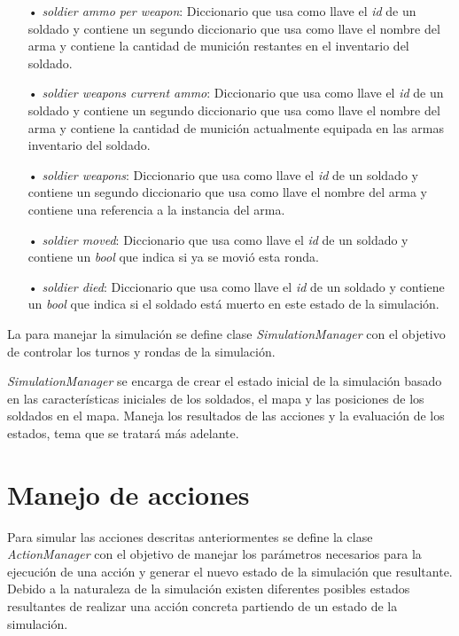 \documentclass[twoside]{article}
\begin{document}
\begin{itemize}
			\item[•] \emph{soldier ammo per weapon}: Diccionario que usa como llave el \emph{id} de un soldado y contiene un segundo diccionario que usa como llave el nombre del arma y contiene la cantidad de munici\'on restantes en el inventario del soldado.
			\item[•] \emph{soldier weapons current ammo}:  Diccionario que usa como llave el \emph{id} de un soldado y contiene un segundo diccionario que usa como llave el nombre del arma y contiene la cantidad de munici\'on actualmente equipada en las armas inventario del soldado.
			\item[•] \emph{soldier weapons}: Diccionario que usa como llave el \emph{id} de un soldado y contiene un segundo diccionario que usa como llave el nombre del arma y contiene una referencia a la instancia del arma.
			\item[•] \emph{soldier moved}: Diccionario que usa como llave el \emph{id} de un soldado y contiene un \emph{bool} que indica si ya se movi\'o esta ronda.
			\item[•] \emph{soldier died}: Diccionario que usa como llave el \emph{id} de un soldado y contiene un \emph{bool} que indica si el soldado est\'a muerto en este estado de la simulaci\'on.
			
		\end{itemize}
		
		La para manejar la simulaci\'on se define clase \emph{SimulationManager} con el objetivo de controlar los turnos y rondas de la simulaci\'on.
		
		\emph{SimulationManager} se encarga de crear el estado inicial de la simulaci\'on basado en las caracter\'isticas iniciales de los soldados, el mapa y las posiciones de los soldados en el mapa. Maneja los resultados de las acciones y la evaluaci\'on de los estados, tema que se tratar\'a m\'as adelante.
		
		
		\section{Manejo de acciones}
		
		Para simular las acciones descritas anteriormentes se define la clase \emph{ActionManager} con el objetivo de manejar los par\'ametros necesarios para la ejecuci\'on de una acci\'on y generar el nuevo estado de la simulaci\'on que resultante. Debido a la naturaleza de la simulaci\'on existen diferentes posibles estados resultantes de realizar una acci\'on concreta partiendo de un estado de la simulaci\'on.
		
\end{document}
